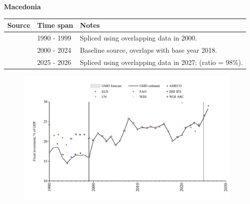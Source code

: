 \documentclass[12pt,a4paper,landscape]{article}
\begin{document}
\begin{adjustbox}{max totalsize={\paperwidth}{\paperheight},center}
\begin{minipage}[t][\textheight][t]{\textwidth}
\vspace*{0.5cm}
{}
\begin{center}
{\Large\bfseries Macedonia}
\end{center}
\vspace{0.5cm}
\begin{table}[H]
\centering
\small
\begin{tabular}{|l|l|l|}
\hline
\textbf{Source} & \textbf{Time span} & \textbf{Notes} \\
\hline
\rowcolor{white}\cite{WDI}& 1990 - 1999 &Spliced using overlapping data in 2000.\\
\rowcolor{lightgray}\cite{EUS}& 2000 - 2024 &Baseline source, overlaps with base year 2018.\\
\rowcolor{white}\cite{AMECO}& 2025 - 2026 &Spliced using overlapping data in 2027: (ratio = 98\%).\\
\hline
\end{tabular}
\end{table}
\begin{figure}[H]
\centering
\includegraphics[width=\textwidth,height=0.6\textheight,keepaspectratio]{graphs/MKD_finv_GDP.pdf}
\end{figure}
\end{minipage}
\end{adjustbox}
\end{document}
